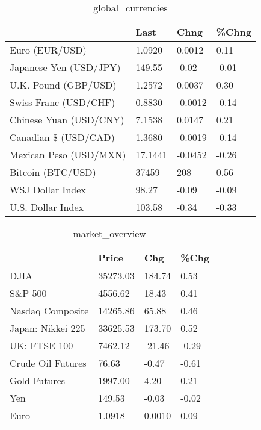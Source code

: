 \documentclass{article}%
\begin{document}
%


\begin{table}[htbp]%
\caption{global\_currencies}%
\centering%
\begin{adjustbox}{width=1\textwidth}%
\begin{tabular}{llll}
\toprule
                       &    Last &    Chng & \%Chng \\
\midrule
        Euro (EUR/USD) &  1.0920 &  0.0012 &  0.11 \\
Japanese Yen (USD/JPY) &  149.55 &   -0.02 & -0.01 \\
  U.K. Pound (GBP/USD) &  1.2572 &  0.0037 &  0.30 \\
 Swiss Franc (USD/CHF) &  0.8830 & -0.0012 & -0.14 \\
Chinese Yuan (USD/CNY) &  7.1538 &  0.0147 &  0.21 \\
  Canadian \$ (USD/CAD) &  1.3680 & -0.0019 & -0.14 \\
Mexican Peso (USD/MXN) & 17.1441 & -0.0452 & -0.26 \\
     Bitcoin (BTC/USD) &   37459 &     208 &  0.56 \\
      WSJ Dollar Index &   98.27 &   -0.09 & -0.09 \\
     U.S. Dollar Index &  103.58 &   -0.34 & -0.33 \\
\bottomrule
\end{tabular}
%
\end{adjustbox}%
\end{table}

%


\begin{table}[htbp]%
\caption{market\_overview}%
\centering%
\begin{adjustbox}{width=1\textwidth}%
\begin{tabular}{llll}
\toprule
                  &    Price &    Chg &  \%Chg \\
\midrule
             DJIA & 35273.03 & 184.74 &  0.53 \\
          S\&P 500 &  4556.62 &  18.43 &  0.41 \\
 Nasdaq Composite & 14265.86 &  65.88 &  0.46 \\
Japan: Nikkei 225 & 33625.53 & 173.70 &  0.52 \\
     UK: FTSE 100 &  7462.12 & -21.46 & -0.29 \\
Crude Oil Futures &    76.63 &  -0.47 & -0.61 \\
     Gold Futures &  1997.00 &   4.20 &  0.21 \\
              Yen &   149.53 &  -0.03 & -0.02 \\
             Euro &   1.0918 & 0.0010 &  0.09 \\
\bottomrule
\end{tabular}
%
\end{adjustbox}%
\end{table}

%
\end{document}
